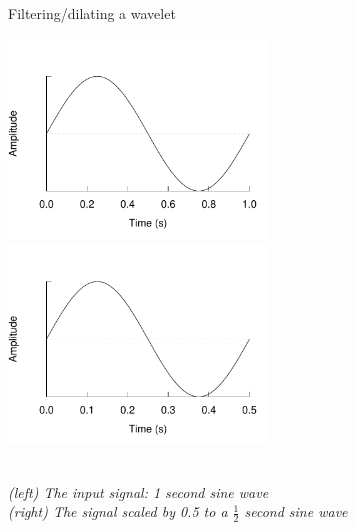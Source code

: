 \begin{figure}[h]
\caption{Filtering/dilating a wavelet}\label{figure:filtering}
\caption*{\\[1em]\footnotesize\textit{(left) The input signal: 1 second sine
wave\\ (right) The signal scaled by 0.5 to a $\frac{1}{2}$ second sine wave}}
\centering
	\includegraphics[width=196pt]{images/sine_full.pdf}
	\hspace{1em}
	\includegraphics[width=196pt]{images/sine_scaled.pdf}
\end{figure}